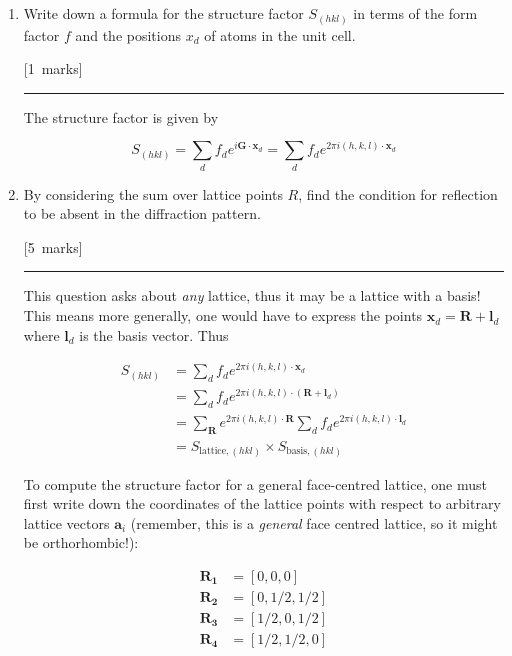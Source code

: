 \documentclass[12pt,a4paper]{article}
\newcommand{\sepline}[0]{\par \hfil\rule{10cm}{0.4pt} \vspace*{\parskip}\hfil}
\begin{document}
\begin{enumerate}
\begin{enumerate}
					\begin{enumerate}
						\item Write down a formula for the structure factor $S_{(hkl)}$ in terms of the form factor $f$ and the positions $x_d$ of atoms in the unit cell.

						\hfill{[1~marks]}

						\begin{answer}

							\sepline

							The structure factor is given by

							$$
							S_{(hkl)} = \sum_d f_d e^{i \mathbf{G}\cdot\mathbf{x}_d} = \sum_d f_d e^{2\pi i (h,k,l)\cdot\mathbf{x}_d}
							$$

						\end{answer}

						\item By considering the sum over lattice points $R$, find the condition for reflection to be absent in the diffraction pattern.

						\hfill{[5~marks]}

						\begin{answer}

							\sepline

							This question asks about \emph{any} lattice, thus it may be a lattice with a basis! This means more generally, one would have to express the points $\mathbf{x}_d = \mathbf{R} + \mathbf{l}_d$ where $\mathbf{l}_d$  is the basis vector. Thus

							\begin{align*}
								S_{(hkl)} & =\sum_d f_d e^{2\pi i (h,k,l)\cdot\mathbf{x}_d} \\
								& = \sum_d f_d e^{2\pi i (h,k,l)\cdot(\mathbf{R} + \mathbf{l}_d)} \\
								& = \sum_\mathbf{R} e^{2\pi i (h,k,l)\cdot \mathbf{R}} \sum_d f_d e^{2\pi i (h,k,l)\cdot \mathbf{l}_d} \\
								& = S_{\mathrm{lattice}, (hkl)} \times S_{\mathrm{basis}, (hkl)}
							\end{align*}

							To compute the structure factor for a general face-centred lattice, one must first write down the coordinates of the lattice points with respect to arbitrary lattice vectors $\mathbf{a}_i$ (remember, this is a \emph{general} face centred lattice, so it might be orthorhombic!):

							\begin{align*}
								\mathbf{R_1} & = [0,0,0] \\
								\mathbf{R_2} & = [0,1/2,1/2] \\
								\mathbf{R_3} & = [1/2,0,1/2] \\
								\mathbf{R_4} & = [1/2,1/2,0]
							\end{align*}


\end{answer}
\end{enumerate}
\end{enumerate}
\end{enumerate}
\end{document}
